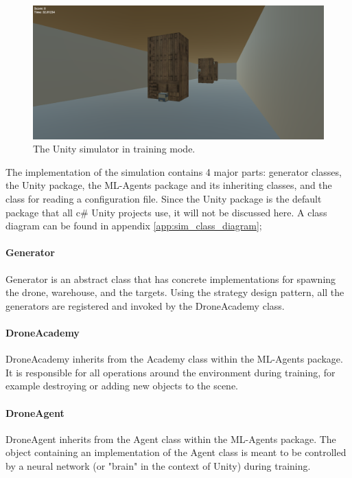 \begin{figure}[h]
	\centering
	\includegraphics[width=\linewidth]{img/unity_drone_training.png}
	\caption{The Unity simulator in training mode.}
	\label{fig:unity_training}
\end{figure}

\noindent
The implementation of the simulation contains 4 major parts: generator classes, the Unity package, the ML-Agents package and its inheriting classes, and the class for reading a configuration file. Since the Unity package is the default package that all c\# Unity projects use, it will not be discussed here. A class diagram can be found in appendix \ref{app:sim_class_diagram};

\paragraph{Generator} Generator is an abstract class that has concrete implementations for spawning the drone, warehouse, and the targets. Using the strategy design pattern, all the generators are registered and invoked by the DroneAcademy class.

\paragraph{DroneAcademy} DroneAcademy inherits from the Academy class within the ML-Agents package. It is responsible for all operations around the environment during training, for example destroying or adding new objects to the scene. \cite{mlagents_github}

\paragraph{DroneAgent} DroneAgent inherits from the Agent class within the ML-Agents package. The object containing an implementation of the Agent class is meant to be controlled by a neural network (or "brain" in the context of Unity) during training. \cite{mlagents_github}

